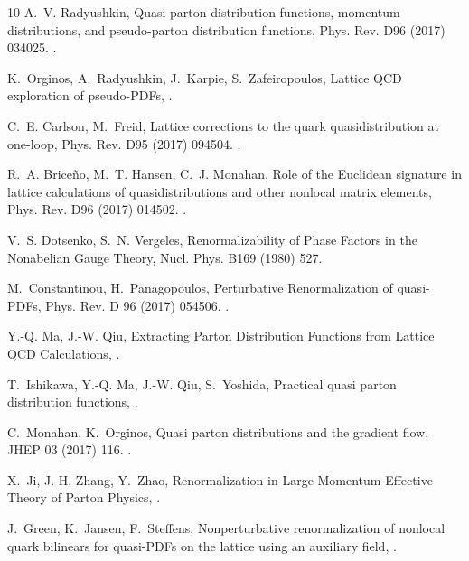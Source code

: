 \begin{thebibliography}{10}
A.~V. Radyushkin, {Quasi-parton distribution functions, momentum distributions,
  and pseudo-parton distribution functions}, Phys. Rev. D96 (2017) 034025.
\newblock \href {http://arxiv.org/abs/1705.01488} {}.

K.~Orginos, A.~Radyushkin, J.~Karpie, S.~Zafeiropoulos, {Lattice QCD
  exploration of pseudo-PDFs, }\href {http://arxiv.org/abs/1706.05373}
  {}.

C.~E. Carlson, M.~Freid, {Lattice corrections to the quark quasidistribution at
  one-loop}, Phys. Rev. D95 (2017) 094504.
\newblock \href {http://arxiv.org/abs/1702.05775} {}.

R.~A. Brice\~no, M.~T. Hansen, C.~J. Monahan, {Role of the Euclidean signature
  in lattice calculations of quasidistributions and other nonlocal matrix
  elements}, Phys. Rev. D96 (2017) 014502.
\newblock \href {http://arxiv.org/abs/1703.06072} {}.

V.~S. Dotsenko, S.~N. Vergeles, {Renormalizability of Phase Factors in the
  Nonabelian Gauge Theory}, Nucl. Phys. B169 (1980) 527.

M.~Constantinou, H.~Panagopoulos, {Perturbative Renormalization of quasi-PDFs},
  Phys. Rev. D 96 (2017) 054506.
\newblock \href {http://arxiv.org/abs/1705.11193} {}.

Y.-Q. Ma, J.-W. Qiu, {Extracting Parton Distribution Functions from Lattice QCD
  Calculations, }\href {http://arxiv.org/abs/1404.6860}
  {}.

T.~Ishikawa, Y.-Q. Ma, J.-W. Qiu, S.~Yoshida, {Practical quasi parton
  distribution functions, }\href {http://arxiv.org/abs/1609.02018}
  {}.

C.~Monahan, K.~Orginos, {Quasi parton distributions and the gradient flow},
  JHEP 03 (2017) 116.
\newblock \href {http://arxiv.org/abs/1612.01584} {}.

X.~Ji, J.-H. Zhang, Y.~Zhao, {Renormalization in Large Momentum Effective
  Theory of Parton Physics, }\href {http://arxiv.org/abs/1706.08962}
  {}.

J.~Green, K.~Jansen, F.~Steffens, {Nonperturbative renormalization of nonlocal
  quark bilinears for quasi-PDFs on the lattice using an auxiliary field,
  }\href {http://arxiv.org/abs/1707.07152} {}.


\end{thebibliography}
